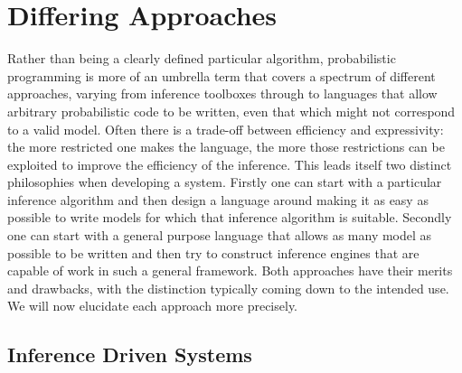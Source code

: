 
\section{Differing Approaches}
\label{sec:probprog:two}

Rather than being a clearly defined particular algorithm,
probabilistic programming is more of an umbrella term that covers a spectrum of 
different approaches, varying from inference toolboxes through to languages that allow
arbitrary probabilistic code to be written, even that which might not correspond to a valid
model.  Often there is a trade-off between efficiency and expressivity: the more restricted
one makes the language, the more those restrictions can be exploited to improve the efficiency
of the inference.  This leads itself two distinct philosophies when developing a system. 
Firstly one can start with a particular inference algorithm and then design a language around making it as
easy as possible to write models for which that inference algorithm is suitable.  Secondly one can start
with  a general purpose language that allows as many model as possible to be written and then try to construct
inference engines that are capable of work in such a general framework.  Both approaches 
have their merits and drawbacks, with the distinction typically coming down to the intended use.
We will now elucidate each approach more precisely.  

\subsection{Inference Driven Systems}
\label{sec:probprog:two:inf}


